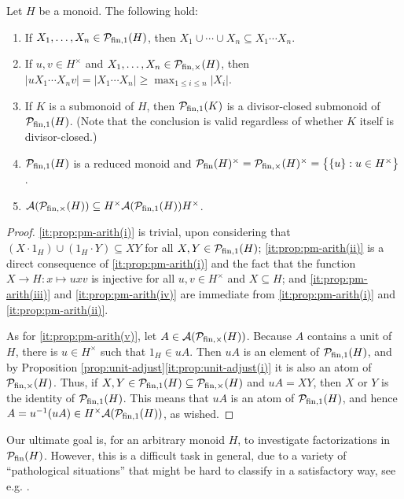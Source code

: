 \begin{prop}\label{prop:pm-arith}
Let $H$ be a monoid. The following hold:
	\begin{enumerate}[label={\rm (\roman{*})}]
	\item\label{it:prop:pm-arith(i)} If $X_1,\ldots,X_n\in \mathcal{P}_{\textrm{fin},1}(H)$, then $X_1 \cup \cdots \cup X_n \subseteq X_1 \cdots X_n$.
	\item\label{it:prop:pm-arith(ii)} If $u,v \in H^\times$ and $X_1,\ldots,X_n\in \mathcal{P}_{\textrm{fin},\times}(H)$, then $|uX_1 \cdots X_nv| = |X_1 \cdots X_n| \ge \max_{1 \le i \le n} |X_i|$.
	\item\label{it:prop:pm-arith(iii)} If $K$ is a submonoid of $H$, then $\mathcal{P}_{\textrm{fin}, 1}(K)$ is a divisor-closed submonoid of $\mathcal{P}_{\textrm{fin}, 1}(H)$. \textup{(}Note that the conclusion is valid regardless of whether $K$ itself is divisor-closed.\textup{)}
	\item \label{it:prop:pm-arith(iv)} $\mathcal{P}_{\textrm{fin}, 1}(H)$ is a reduced monoid and $\mathcal{P}_{\textrm{fin}}(H)^\times=\mathcal{P}_{\textrm{fin}, \times}(H)^\times = \bigl\{ \{u\}: u\in H^\times\bigr\}$.
	\item \label{it:prop:pm-arith(v)} $\mathcal{A}(\mathcal P_{{\textrm{fin}, \times}}(H)) \subseteq H^\times \mathcal{A}(\mathcal P_{{\textrm{fin}, 1}}(H)) H^\times$.
	\end{enumerate}
\end{prop}
%
\begin{proof}
\ref{it:prop:pm-arith(i)} is trivial, upon considering that $(X \cdot 1_H) \cup (1_H \cdot Y) \subseteq XY$ for all $X, Y \in \mathcal P_{\textrm{fin}, 1}(H)$; \ref{it:prop:pm-arith(ii)} is a direct consequence of \ref{it:prop:pm-arith(i)} and the fact that the function $X \to H: x \mapsto uxv$ is injective for all $u, v \in H^\times$ and $X \subseteq H$; and \ref{it:prop:pm-arith(iii)} and \ref{it:prop:pm-arith(iv)} are immediate from \ref{it:prop:pm-arith(i)} and \ref{it:prop:pm-arith(ii)}.

As for \ref{it:prop:pm-arith(v)}, let $A\in \mathcal{A}(\mathcal{P}_{\textrm{fin}, \times}(H))$.
	Because $A$ contains a unit of $H$, there is $u\in H^\times$ such that $1_H \in uA$.
	Then $uA$ is an element of $\mathcal{P}_{\textrm{fin}, 1}(H)$, and by Proposition \ref{prop:unit-adjust}\ref{it:prop:unit-adjust(i)} it is also an atom of $\mathcal{P}_{\textrm{fin}, \times}(H)$.
	Thus, if $X,Y\in \mathcal{P}_{\textrm{fin}, 1}(H) \subseteq \mathcal{P}_{\textrm{fin}, \times}(H)$ and $uA = XY$, then $X$ or $Y$ is the identity of $\mathcal{P}_{\textrm{fin}, 1}(H)$.
	This means that $uA$ is an atom of $\mathcal{P}_{\textrm{fin}, 1}(H)$, and hence $A=u^{-1}(uA)\in H^\times \mathcal{A}(\mathcal{P}_{\textrm{fin}, 1}(H))$, as wished.
\end{proof}
%
%
Our ultimate goal is, for an arbitrary monoid $H$, to investigate factorizations in $\mathcal{P}_{\textrm{fin}}(H)$. However, this is a difficult task in general, due to a variety of ``pathological situations'' that might be hard to classify in a satisfactory way, see e.g. \cite[Remark 3.3(ii)]{fan-tringali18}.

